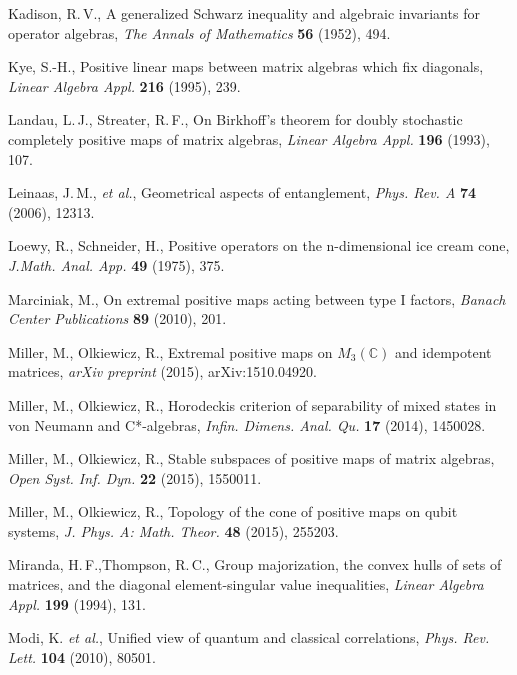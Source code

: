 {\begin{thebibliography}{99}
    Kadison, R.\,V.,
    A generalized Schwarz inequality and algebraic invariants for operator algebras,
    \emph{The Annals of Mathematics} {\bf 56} (1952), 494.

    Kye, S.-H.,
    Positive linear maps between matrix algebras which fix diagonals,
    \emph{Linear Algebra Appl.} {\bf 216} (1995), 239.

    Landau, L.\,J., Streater, R.\,F.,
    On Birkhoff's theorem for doubly stochastic completely positive maps of matrix algebras,
    \emph{Linear Algebra Appl.} {\bf 196} (1993), 107.

    Leinaas, J.\,M., \emph{et al.},
    Geometrical aspects of entanglement,
    \emph{Phys. Rev. A} {\bf 74} (2006), 12313.

    Loewy, R., Schneider, H.,
    Positive operators on the n-dimensional ice cream cone,
    \emph{J.Math. Anal. App.} {\bf 49} (1975), 375.

    Marciniak, M.,
    On extremal positive maps acting between type I factors,
    \emph{Banach Center Publications} {\bf 89} (2010), 201.

    Miller, M., Olkiewicz, R.,
    Extremal positive maps on $M_{3}(\mathbb{C})$ and idempotent matrices,
    \emph{arXiv preprint} (2015), arXiv:1510.04920.

    Miller, M., Olkiewicz, R.,
    Horodeckis criterion of separability of mixed states in von Neumann and C*-algebras,
    \emph{Infin. Dimens. Anal. Qu.} {\bf 17} (2014), 1450028.

    Miller, M., Olkiewicz, R.,
    Stable subspaces of positive maps of matrix algebras,
    \emph{Open Syst. Inf. Dyn.} {\bf 22} (2015), 1550011.

    Miller, M., Olkiewicz, R.,
    Topology of the cone of positive maps on qubit systems,
    \emph{J. Phys. A: Math. Theor.} {\bf 48} (2015), 255203.

    Miranda, H.\,F.,Thompson, R.\,C.,
    Group majorization, the convex hulls of sets of matrices, and the diagonal element-singular value inequalities,
    \emph{Linear Algebra Appl.} {\bf 199} (1994), 131.

    Modi, K. \emph{et al.},
    Unified view of quantum and classical correlations,
    \emph{Phys. Rev. Lett.} {\bf 104} (2010), 80501.


\end{thebibliography}}
